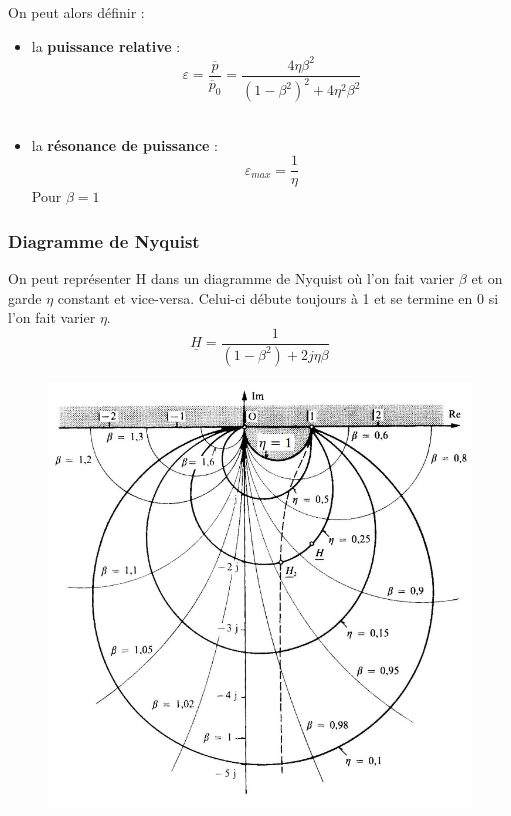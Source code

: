 \documentclass[../main.tex]{subfiles}
\begin{document}
On peut alors définir : \begin{itemize}
    \item la \textbf{puissance relative} : \begin{equation}
    \varepsilon = \frac{\overline{p}}{\overline{p}_0} = \frac{4\eta \beta^2}{(1-\beta^2)^2 + 4\eta^2 \beta^2}
\end{equation}\\
\item la \textbf{résonance de puissance} : \begin{equation}
    \varepsilon_{max} = \frac{1}{\eta}
\end{equation} Pour $\beta = 1$\\
\end{itemize} 

\subsubsection{Diagramme de Nyquist}
On peut représenter H dans un diagramme de Nyquist où l'on fait varier $\beta$ et on garde $\eta$ constant et vice-versa. Celui-ci débute toujours à 1 et se termine en 0 si l'on fait varier $\eta$.\\
\begin{equation}
    \underline{H} = \frac{1}{(1-\beta^2)+2j \eta \beta}
\end{equation}

\begin{figure}[hbt!]
    \centering
    \includegraphics[width=\textwidth]{IMAGES/mecavib/nyquistH.png}
\end{figure}
\end{document}
